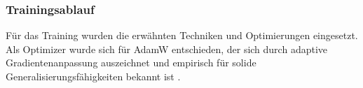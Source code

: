 \subsubsection{Trainingsablauf}

Für das Training wurden die erwähnten Techniken und Optimierungen eingesetzt. Als Optimizer wurde sich für AdamW entschieden, der sich durch adaptive Gradientenanpassung auszeichnet und empirisch für solide Generalisierungsfähigkeiten bekannt ist \cite{adamw, adamw_good, adamw_good2, adamw_good3, adamw_good4}.




